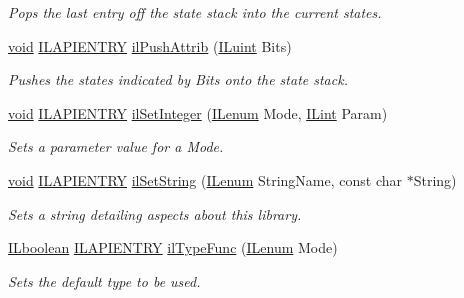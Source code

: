 \begin{DoxyCompactItemize}
\begin{DoxyCompactList}\small\item\em Pops the last entry off the state stack into the current states. \end{DoxyCompactList}\item 
\hyperlink{_i_l_8h_a5530e04d947bcddd83639ea7940faf10}{void} \hyperlink{_i_l_8h_a69c08a8d06df986f7e46f209d131ef2f}{I\+L\+A\+P\+I\+E\+N\+T\+R\+Y} \hyperlink{group__state_ga72e0879c71f59f06c35d2e2a10191fa8}{il\+Push\+Attrib} (\hyperlink{group__il__types_gaff8e86a1072c8d7cfe387fb87c6ed8e1}{I\+Luint} Bits)
\begin{DoxyCompactList}\small\item\em Pushes the states indicated by Bits onto the state stack. \end{DoxyCompactList}\item 
\hyperlink{_i_l_8h_a5530e04d947bcddd83639ea7940faf10}{void} \hyperlink{_i_l_8h_a69c08a8d06df986f7e46f209d131ef2f}{I\+L\+A\+P\+I\+E\+N\+T\+R\+Y} \hyperlink{group__state_ga74a39ec8faa5aa005e918a7049985ef6}{il\+Set\+Integer} (\hyperlink{group__il__types_ga62ca73445716183ef42b1f3906a45ed0}{I\+Lenum} Mode, \hyperlink{group__il__types_ga8effe51a00daaa0878631e5af75a36cb}{I\+Lint} Param)
\begin{DoxyCompactList}\small\item\em Sets a parameter value for a {\itshape Mode}. \end{DoxyCompactList}\item 
\hyperlink{_i_l_8h_a5530e04d947bcddd83639ea7940faf10}{void} \hyperlink{_i_l_8h_a69c08a8d06df986f7e46f209d131ef2f}{I\+L\+A\+P\+I\+E\+N\+T\+R\+Y} \hyperlink{group__state_ga9a4eb898282d4a5cdecc6303bca20814}{il\+Set\+String} (\hyperlink{group__il__types_ga62ca73445716183ef42b1f3906a45ed0}{I\+Lenum} String\+Name, const char $\ast$String)
\begin{DoxyCompactList}\small\item\em Sets a string detailing aspects about this library. \end{DoxyCompactList}\item 
\hyperlink{group__il__types_gaa6aa7c95cfdc06b4d8601ef832b7bb0a}{I\+Lboolean} \hyperlink{_i_l_8h_a69c08a8d06df986f7e46f209d131ef2f}{I\+L\+A\+P\+I\+E\+N\+T\+R\+Y} \hyperlink{group__state_ga7ab67de503e1fad00d984167aee02fa9}{il\+Type\+Func} (\hyperlink{group__il__types_ga62ca73445716183ef42b1f3906a45ed0}{I\+Lenum} Mode)
\begin{DoxyCompactList}\small\item\em Sets the default type to be used. \end{DoxyCompactList}\end{DoxyCompactItemize}


